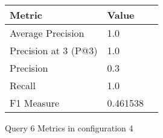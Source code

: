 \begin{figure}[H]
\begin{center}
\begin{tabular}{lll}
\toprule
{}                      Metric &         Value \\
\midrule
     Average Precision &       1.0 \\
  Precision at 3 (P@3) &       1.0 \\
             Precision &       0.3 \\
                Recall &       1.0 \\
            F1 Measure &  0.461538 \\
\bottomrule
\end{tabular}
\end{center}
\caption{Query 6 Metrics in configuration 4}
\label{fig:query_6_metrics_config_4}
\end{figure}